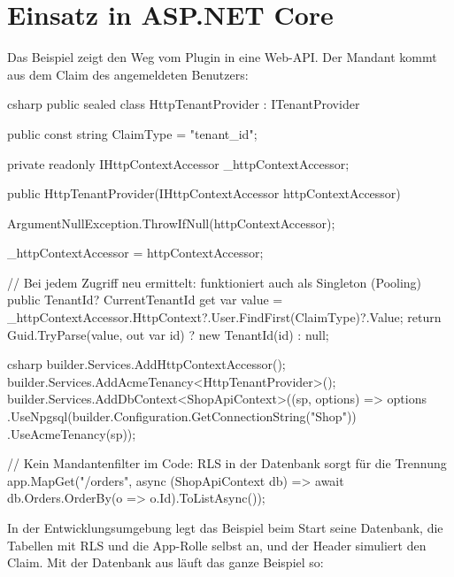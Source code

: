 \chapter{Einsatz in ASP.NET Core}\label{ch:using-the-plugin-in-asp}

Das Beispiel  zeigt den Weg vom Plugin in
eine Web-API. Der Mandant kommt aus dem Claim  des
angemeldeten Benutzers:

\begin{sourcecode}{csharp}
public sealed class HttpTenantProvider : ITenantProvider
{
    public const string ClaimType = "tenant_id";

    private readonly IHttpContextAccessor _httpContextAccessor;

    public HttpTenantProvider(IHttpContextAccessor httpContextAccessor)
    {
        ArgumentNullException.ThrowIfNull(httpContextAccessor);

        _httpContextAccessor = httpContextAccessor;
    }

    // Bei jedem Zugriff neu ermittelt: funktioniert auch als Singleton (Pooling)
    public TenantId? CurrentTenantId
    {
        get
        {
            var value = _httpContextAccessor.HttpContext?.User.FindFirst(ClaimType)?.Value;
            return Guid.TryParse(value, out var id) ? new TenantId(id) : null;
        }
    }
}
\end{sourcecode}

\begin{sourcecode}{csharp}
builder.Services.AddHttpContextAccessor();
builder.Services.AddAcmeTenancy<HttpTenantProvider>();
builder.Services.AddDbContext<ShopApiContext>((sp, options) => options
    .UseNpgsql(builder.Configuration.GetConnectionString("Shop"))
    .UseAcmeTenancy(sp));

// Kein Mandantenfilter im Code: RLS in der Datenbank sorgt für die Trennung
app.MapGet("/orders", async (ShopApiContext db) =>
    await db.Orders.OrderBy(o => o.Id).ToListAsync());
\end{sourcecode}

In der Entwicklungsumgebung legt das Beispiel beim Start seine Datenbank, die Tabellen mit RLS
und die App-Rolle selbst an, und der Header 
simuliert den Claim. Mit der Datenbank aus  läuft das
ganze Beispiel so:


